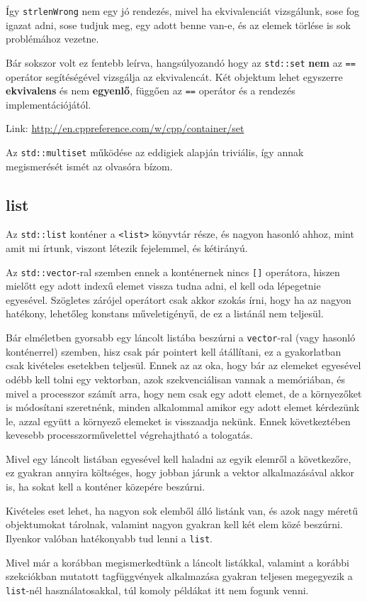 \documentclass[a4paper,11.5pt,table]{article}
\begin{document}
	Így \texttt{strlenWrong} nem egy jó rendezés, mivel ha ekvivalenciát vizsgálunk, sose fog igazat adni, sose tudjuk meg, egy adott benne van-e, és az elemek törlése is sok problémához vezetne.
	\begin{note}
		Bár sokszor volt ez fentebb leírva, hangsúlyozandó hogy az \texttt{std::set} \textbf{nem} az \texttt{==} operátor segítéségével vizsgálja az ekvivalencát. Két objektum lehet egyszerre \textbf{ekvivalens} és nem \textbf{egyenlő}, függően az \texttt{==} operátor és a rendezés implementációjától.
	\end{note}
	Link: \url{http://en.cppreference.com/w/cpp/container/set}
	
	\begin{note}
		Az \texttt{std::multiset} működése az eddigiek alapján triviális, így annak megismerését ismét az olvasóra bízom.
	\end{note}
	\subsection{list}
	Az \texttt{std::list} konténer a \texttt{<list>} könyvtár része, és nagyon hasonló ahhoz, mint amit mi írtunk, viszont létezik fejelemmel, és kétirányú.
	\smallskip
	
	Az \texttt{std::vector}-ral szemben ennek a konténernek nincs \texttt{[]} operátora, hiszen mielőtt egy adott indexű elemet vissza tudna adni, el kell oda lépegetnie egyesével. Szögletes zárójel operátort csak akkor szokás írni, hogy ha az nagyon hatékony, lehetőleg konstans műveletigényű, de ez a listánál nem teljesül.
	\begin{note}
		Bár elméletben gyorsabb egy láncolt listába beszúrni a \texttt{vector}-ral (vagy hasonló konténerrel) szemben, hisz csak pár pointert kell átállítani, ez a gyakorlatban csak kivételes esetekben teljesül. Ennek az az oka, hogy bár az elemeket egyesével odébb kell tolni egy vektorban, azok szekvenciálisan vannak a memóriában, és mivel a processzor számít arra, hogy nem csak egy adott elemet, de a környezőket is módosítani szeretnénk, minden alkalommal amikor egy adott elemet kérdezünk le, azzal együtt a környező elemeket is visszaadja nekünk. Ennek következtében kevesebb processzorművelettel végrehajtható a tologatás.
		
		Mivel egy láncolt listában egyesével kell haladni az egyik elemről a következőre, ez gyakran annyira költséges, hogy jobban járunk a vektor alkalmazásával akkor is, ha sokat kell a konténer közepére beszúrni.
		
		Kivételes eset lehet, ha nagyon sok elemből álló listánk van, és azok nagy méretű objektumokat tárolnak, valamint nagyon gyakran kell két elem közé beszúrni. Ilyenkor valóban hatékonyabb tud lenni a \texttt{list}.
	\end{note}
	Mivel már a korábban megismerkedtünk a láncolt listákkal, valamint a korábbi szekciókban mutatott tagfüggvények alkalmazása gyakran teljesen megegyezik a \texttt{list}-nél használatosakkal, túl komoly példákat itt nem fogunk venni. 
	
\end{document}
